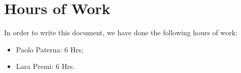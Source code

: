 \documentclass[12pt,a4paper]{article}
\begin{document}
	
	\tableofcontents
	\newpage
	
	
	
	\section{Hours of Work}
	In order to write this document, we have done the following hours of work:
	\begin{itemize}
	\item Paolo Paterna: 6 Hrs;
	\item Lara Premi: 6 Hrs.
	\end{itemize}
	\newpage
\end{document}
